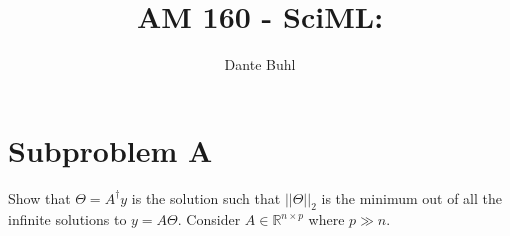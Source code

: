 \documentclass{article}
\begin{document}
\title{AM 160 - SciML:}
\author{Dante Buhl}


\newcommand{\wrms}{w_{\text{rms}}}
\newcommand{\bs}[1]{\boldsymbol{#1}}
\newcommand{\tb}[1]{\textbf{#1}}
\newcommand{\bmp}[1]{\begin{minipage}{#1\textwidth}}
\newcommand{\emp}{\end{minipage}}
\newcommand{\R}{\mathbb{R}}
\newcommand{\C}{\mathbb{C}}
\newcommand{\N}{\mathcal{N}}
\newcommand{\K}{\bs{\mathrm{K}}}
\newcommand{\m}{\bs{\mu}_*}
\newcommand{\s}{\bs{\Sigma}_*}
\newcommand{\dt}{\Delta t}
\newcommand{\dx}{\Delta x}
\newcommand{\tr}[1]{\text{Tr}(#1)}
\newcommand{\Tr}[1]{\text{Tr}(#1)}
\newcommand{\Div}{\nabla \cdot}
\renewcommand{\div}{\nabla \cdot}
\newcommand{\Curl}{\nabla \times}
\newcommand{\Grad}{\nabla}
\newcommand{\grad}{\nabla}
\newcommand{\grads}{\nabla_s}
\newcommand{\gradf}{\nabla_f}
\newcommand{\xs}{x_s}
\newcommand{\xf}{x_f}
\newcommand{\ts}{t_s}
\newcommand{\tf}{t_f}
\newcommand{\pt}{\partial t}
\newcommand{\pz}{\partial z}
\newcommand{\uvec}{\bs{u}}
\newcommand{\F}{\bs{F}}
\newcommand{\T}{\tilde{T}}
\newcommand{\ez}{\bs{e}_z}
\newcommand{\ex}{\bs{e}_x}
\newcommand{\ey}{\bs{e}_y}
\newcommand{\eo}{\bs{e}_{\bs{\Omega}}}
\newcommand{\ppt}[1]{\frac{\partial #1}{\partial t}}
\newcommand{\DDt}[1]{\frac{D #1}{D t}}
\newcommand{\ppts}[1]{\frac{\partial #1}{\partial t_s}}
\newcommand{\pptf}[1]{\frac{\partial #1}{\partial t_f}}
\newcommand{\ppz}[1]{\frac{\partial #1}{\partial z}}
\newcommand{\ddz}[1]{\frac{d #1}{d z}}
\newcommand{\ppzetas}[1]{\frac{\partial^2 #1}{\partial \zeta^2}}
\newcommand{\ppzs}[1]{\frac{\partial #1}{\partial z_s}}
\newcommand{\ppzf}[1]{\frac{\partial #1}{\partial z_f}}
\newcommand{\ppx}[1]{\frac{\partial #1}{\partial x}}
\newcommand{\ppxi}[1]{\frac{\partial #1}{\partial x_i}}
\newcommand{\ppxj}[1]{\frac{\partial #1}{\partial x_j}}
\newcommand{\ppy}[1]{\frac{\partial #1}{\partial y}}
\newcommand{\ppzeta}[1]{\frac{\partial #1}{\partial \zeta}}


\maketitle 
\setlength{\parindent}{0pt}
\doublespacing

\section{Subproblem A}

Show that $\Theta = A^{\dagger}y$ is the solution such that $||\Theta||_2$ is
the minimum out of all the infinite solutions to $y = A\Theta$. Consider $A \in
\R^{n\times p}$ where $p\gg n$. 
\end{document}
